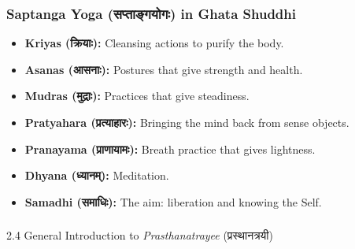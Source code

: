 \begin{frame}[fragile]\frametitle{Saptanga Yoga (सप्ताङ्गयोगः) in Ghata Shuddhi}
\begin{itemize}
    \item \textbf{Kriyas (क्रियाः):} Cleansing actions to purify the body.
    \item \textbf{Asanas (आसनाः):} Postures that give strength and health.
    \item \textbf{Mudras (मुद्राः):} Practices that give steadiness.
    \item \textbf{Pratyahara (प्रत्याहारः):} Bringing the mind back from sense objects.
    \item \textbf{Pranayama (प्राणायामः):} Breath practice that gives lightness.
    \item \textbf{Dhyana (ध्यानम्):} Meditation.
    \item \textbf{Samadhi (समाधिः):} The aim: liberation and knowing the Self.
\end{itemize}
\end{frame}


\begin{frame}[fragile]\frametitle{}
\begin{center}
{\Large 2.4 General Introduction to \textit{Prasthanatrayee} (प्रस्थानत्रयी)}
\end{center}
\end{frame}

